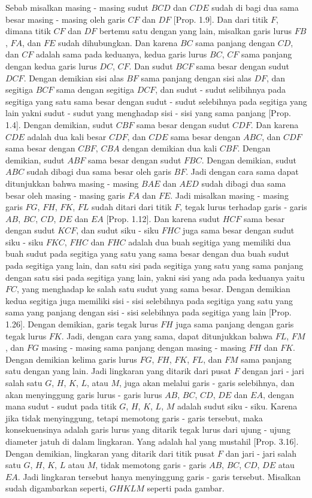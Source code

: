 \documentclass[a4paper]{book}
\begin{document}
Sebab misalkan masing - masing sudut $BCD$ dan $CDE$ sudah di bagi dua 
sama besar masing - masing oleh garis $CF$ dan $DF$ [Prop. 1.9]. Dan dari
titik $F$, dimana titik $CF$ dan $DF$ bertemu satu dengan yang lain, 
misalkan garis lurus $FB$, $FA$, dan $FE$ sudah dihubungkan. Dan karena
$BC$ sama panjang dengan $CD$, dan $CF$ adalah sama pada keduanya, kedua
garis lurus $BC$, $CF$ sama panjang dengan kedua garis lurus $DC$, $CF$.
Dan sudut $BCF$ sama besar dengan sudut $DCF$. Dengan demikian sisi alas
$BF$ sama panjang dengan sisi alas $DF$, dan segitiga $BCF$ sama dengan
segitiga $DCF$, dan sudut - sudut selibihnya pada segitiga yang satu 
sama besar dengan sudut - sudut selebihnya pada segitiga yang lain
yakni sudut - sudut yang menghadap sisi - sisi yang sama panjang [Prop. 1.4].
Dengan demikian, sudut $CBF$ sama besar dengan sudut $CDF$. Dan karena
$CDE$ adalah dua kali besar $CDF$, dan $CDE$ sama besar dengan $ABC$, dan
$CDF$ sama besar dengan $CBF$, $CBA$ dengan demikian dua kali  $CBF$.
Dengan demikian, sudut $ABF$ sama besar dengan sudut $FBC$. Dengan demikian,
sudut $ABC$ sudah dibagi dua sama besar oleh garis $BF$. Jadi dengan cara 
sama dapat ditunjukkan bahwa masing - masing $BAE$ dan $AED$ sudah dibagi 
dua sama besar oleh masing - masing garis $FA$ dan $FE$. Jadi misalkan masing 
- masing garis $FG$, $FH$, $FK$, $FL$ sudah ditari dari titik $F$, tegak lurus 
terhadap  garis - garis $AB$, $BC$, $CD$, $DE$ dan $EA$ [Prop. 1.12]. Dan
karena sudut $HCF$ sama besar dengan sudut $KCF$, dan sudut siku - siku
$FHC$ juga sama besar dengan sudut siku - siku $FKC$, $FHC$ dan $FHC$ adalah
dua buah segitiga yang memiliki dua buah sudut pada segitiga yang satu yang 
sama besar dengan dua buah sudut pada segitiga yang lain, dan satu sisi pada 
segitiga yang satu yang sama
panjang dengan satu sisi pada segitiga yang lain, yakni sisi yang ada 
pada keduanya 
yaitu $FC$, yang menghadap ke salah satu sudut yang sama besar. Dengan 
demikian kedua segitiga juga memiliki sisi - sisi selebihnya pada segitiga 
yang satu yang sama yang panjang dengan sisi - sisi selebihnya pada 
segitiga yang lain
[Prop. 1.26]. Dengan demikian, garis tegak lurus $FH$ juga sama panjang dengan
garis tegak lurus $FK$. Jadi, dengan cara yang sama, dapat ditunjukkan
bahwa $FL$, $FM$, dan $FG$ masing - masing sama panjang dengan
masing  - masing $FH$ dan $FK$. Dengan demikian kelima garis lurus
$FG$, $FH$, $FK$, $FL$, dan $FM$ sama panjang satu dengan yang lain. Jadi
lingkaran yang ditarik dari pusat $F$ dengan jari - jari salah satu $G$,
$H$, $K$, $L$, atau $M$, juga akan melalui garis - garis selebihnya, dan
akan menyinggung garis lurus - garis lurus $AB$, $BC$, $CD$, $DE$ dan $EA$,
dengan mana sudut - sudut pada titik $G$, $H$, $K$, $L$, $M$ adalah sudut
siku - siku. Karena jika tidak menyinggung, tetapi memotong garis - garis
tersebut, maka konsekuensinya adalah garis lurus yang ditarik tegak lurus dari
ujung - ujung  diameter jatuh di dalam lingkaran. Yang adalah hal yang 
mustahil [Prop. 3.16]. Dengan demikian, lingkaran yang ditarik dari 
titik pusat $F$ dan jari - jari salah satu $G$, $H$, $K$, $L$ atau $M$, 
tidak memotong garis - garis $AB$, $BC$, $CD$, $DE$ atau $EA$. Jadi lingkaran
tersebut hanya menyinggung garis - garis tersebut. Misalkan sudah digambarkan 
seperti, $GHKLM$ seperti pada gambar.
\end{document}
